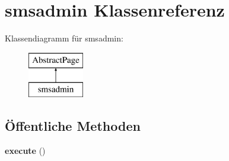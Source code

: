 \hypertarget{classsmsadmin}{}\section{smsadmin Klassenreferenz}
\label{classsmsadmin}
Klassendiagramm für smsadmin\+:\begin{figure}[H]
\begin{center}
\leavevmode
\includegraphics[height=2.000000cm]{classsmsadmin}
\end{center}
\end{figure}
\subsection*{Öffentliche Methoden}
\begin{DoxyCompactItemize}
\item 
\mbox{\label{classsmsadmin_aeeb1b621b0fe5406f5205acd0f3c3066}} 
{\bfseries execute} ()
\end{DoxyCompactItemize}
